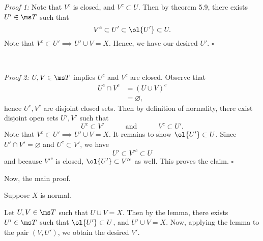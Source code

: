 \documentclass{fkpset}
\begin{document}
\begin{solution}[Solution 1:]
\begin{leftbar}
      \begin{adjustwidth}{.025\linewidth}{.025\linewidth}
        \color{RedOrange}
        \begin{boxedminipage}{\linewidth}
          \emph{Proof 1:} Note that $V^c$ is closed, and $V^c \subset
          U$. Then by theorem 5.9, there exists $U' \in \ms T$ such
          that
          \[
            V^c \subset U' \subset \ol{U'} \subset U.
          \]
          Note that $V^c \subset U' \implies U' \cup V = X$. Hence, we
          have our desired $U'$. \hfill $\square$
        \end{boxedminipage}
      \end{adjustwidth}
      ~
      \begin{adjustwidth}{.025\linewidth}{.025\linewidth}
        \color{TealBlue}
        \begin{boxedminipage}{\linewidth}
          \emph{Proof 2:} $U,V \in \ms T$ implies $U^c$ and $V^c$ are
          closed. Observe that
          \begin{align*}
            U^c \cap V^c
            &= (U \cup V)^c \\
            &= \varnothing,
          \end{align*}
          hence $U^c, V^c$ are disjoint closed sets. Then by
          definition of normality, there exist disjoint open sets
          $U',V'$ such that
          \[
            U^c \subset V' \qquad\quad \text{and} \quad\qquad V^c
            \subset U'.
          \]
          Note that $V^c \subset U' \implies U' \cup V = X$. It
          remains to show $\ol{U'} \subset U$. Since $U' \cap V' =
          \varnothing$ and $U^c \subset V'$, we have
          \[
            U' \subset V'^c \subset U
          \]
          and because $V'^c$ is closed, $\ol{U'} \subset V'^c$ as
          well. This proves the claim. \hfill $\square$
        \end{boxedminipage}
      \end{adjustwidth}
      Now, the main proof.
    \end{leftbar}

    \begin{iffproof}
    \item Suppose $X$ is normal.

        Let $U,V \in \ms T$ such that $U \cup V = X$. Then by the
        lemma, there exists $U' \in \ms T$ such that $\ol{U'} \subset
        U$, and $U' \cup V = X$. Now, applying the lemma to the pair
        $(V, U')$, we obtain the desired $V'$. \cmark


\end{iffproof}
\end{solution}
\end{document}
